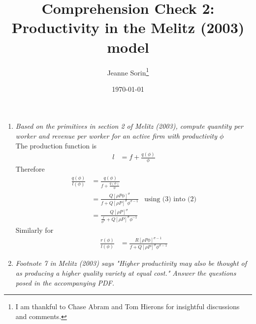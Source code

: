 \documentclass[10pt, final]{article}
\title{Comprehension Check 2: Productivity in the Melitz (2003) model}
\author{Jeanne Sorin\footnote{I am thankful to Chase Abram and Tom Hierons for insightful discussions and comments.}}
\date{\today}
\begin{document}
\maketitle

\begin{enumerate}[1.]
	\item \textit{Based on the primitives in section 2 of Melitz (2003), compute quantity per worker and revenue per worker for an active firm with productivity $\phi$}
	\\
	The production function is
	\begin{align*}
		l &= f + \frac{q(\phi)}{\phi}
	\end{align*}
	Therefore
	\begin{align*}
		\frac{q(\phi)}{l(\phi)} &= \frac{q(\phi)}{f + \frac{q(\phi)}{\phi}} \\
		&= \frac{Q[\rho P \phi]^{\sigma}}{f + Q [\rho P]^{\sigma}\phi^{\sigma-1}} &\text{using (3) into (2)} \\
		&= \frac{Q[\rho P]^{\sigma}}{\frac{f}{\phi^{\sigma}} + Q [\rho P]^{\sigma}\phi^{-1}}
	\end{align*}
	Similarly for 
\begin{align*}
	\frac{r(\phi)}{l(\phi)} &= \frac{R [\rho P \phi]^{\sigma-1}}{f + Q[\rho P]^{\sigma}\phi^{\sigma-1}}
\end{align*}

	\item \textit{Footnote 7 in Melitz (2003) says "Higher productivity may also be thought of as producing a higher quality variety at equal cost." Answer the questions posed in the accompanying PDF.}


\end{enumerate}
\end{document}
